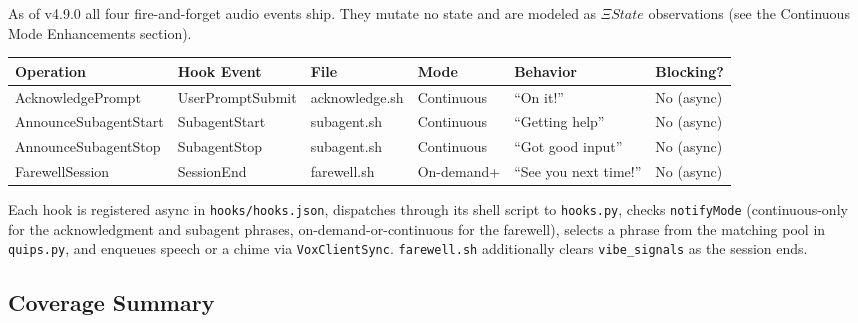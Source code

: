 \documentclass[a4paper,10pt,fleqn]{article}
\begin{document}
As of v4.9.0 all four fire-and-forget audio events ship. They mutate
no state and are modeled as $\Xi State$ observations (see the
Continuous Mode Enhancements section).

\begin{tabular}{llllll}
\hline
\textbf{Operation} & \textbf{Hook Event} & \textbf{File} & \textbf{Mode} & \textbf{Behavior} & \textbf{Blocking?} \\
\hline
AcknowledgePrompt & UserPromptSubmit & acknowledge.sh & Continuous & ``On it!'' & No (async) \\
AnnounceSubagentStart & SubagentStart & subagent.sh & Continuous & ``Getting help'' & No (async) \\
AnnounceSubagentStop & SubagentStop & subagent.sh & Continuous & ``Got good input'' & No (async) \\
FarewellSession & SessionEnd & farewell.sh & On-demand+ & ``See you next time!'' & No (async) \\
\hline
\end{tabular}

Each hook is registered async in \texttt{hooks/hooks.json}, dispatches
through its shell script to \texttt{hooks.py}, checks \texttt{notifyMode}
(continuous-only for the acknowledgment and subagent phrases,
on-demand-or-continuous for the farewell), selects a phrase from the
matching pool in \texttt{quips.py}, and enqueues speech or a chime via
\texttt{VoxClientSync}. \texttt{farewell.sh} additionally clears
\texttt{vibe\_signals} as the session ends.

\subsection{Coverage Summary}
\end{document}
